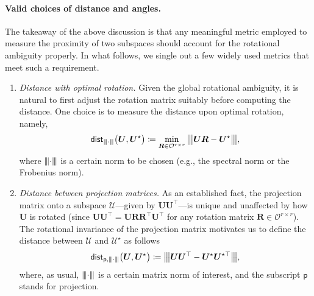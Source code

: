 \paragraph{Valid choices of distance and angles.}
The takeaway of the above discussion is that any meaningful metric employed to measure the proximity of two subspaces should account for the rotational ambiguity properly.
In what follows, we single out a few widely used metrics that meet such a requirement.




\begin{enumerate}

		
\item \emph{Distance with optimal rotation.}  Given the global rotational ambiguity, it is natural to first adjust the rotation matrix suitably before computing the distance.  One choice is to measure the distance upon optimal rotation, namely,
%
\begin{align}
	\mathsf{dist}_{{\left\vert\kern-0.25ex\left\vert\kern-0.25ex\left\vert \cdot \right\vert\kern-0.25ex\right\vert\kern-0.25ex\right\vert}}\big(\bm{U},{\bm{U}}^{\star}\big) \coloneqq
	\min _{\bm{R}\in \mathcal{O}^{r\times r}} {\big\vert\kern-0.25ex\big\vert\kern-0.25ex\big\vert  \bm{U} \bm{R} - \bm{U}^{\star}   \big\vert\kern-0.25ex\big\vert\kern-0.25ex\big\vert} ,
	\label{defn:dist-rotation}
\end{align}
where ${\left\vert\kern-0.25ex\left\vert\kern-0.25ex\left\vert \cdot \right\vert\kern-0.25ex\right\vert\kern-0.25ex\right\vert}$ is a certain norm to be chosen (e.g., the spectral norm or the Frobenius norm).



		
\item \emph{Distance between projection matrices.}  As an established fact, the projection matrix onto a subspace $\mathcal{U}$---given by $\bm{U}\bm{U}^{\top}$---is unique and unaffected by how $\bm{U}$ is rotated (since $\bm{U}\bm{U}^{\top}=\bm{U}\bm{R}\bm{R}^{\top}\bm{U}^{\top}$ for any rotation matrix $\bm{R}\in \mathcal{O}^{r\times r}$).
The rotational invariance of the projection matrix motivates us to define the distance between  $\mathcal{U}$
and ${\mathcal{U}}^{\star}$ as follows
%
\begin{equation}
	\mathsf{dist}_{\mathsf{p},{\left\vert\kern-0.25ex\left\vert\kern-0.25ex\left\vert \cdot \right\vert\kern-0.25ex\right\vert\kern-0.25ex\right\vert}}\big(\bm{U},{\bm{U}}^{\star}\big) \coloneqq {\big\vert\kern-0.25ex\big\vert\kern-0.25ex\big\vert \bm{U} \bm{U}^{\top}- {\bm{U}}^{\star} {\bm{U}}^{\star\top} \big\vert\kern-0.25ex\big\vert\kern-0.25ex\big\vert},
	\label{eq:algebraic-dist}
\end{equation}
%
where, as usual, ${\left\vert\kern-0.25ex\left\vert\kern-0.25ex\left\vert \cdot \right\vert\kern-0.25ex\right\vert\kern-0.25ex\right\vert}$ is a certain matrix norm of interest, and the subscript $\mathsf{p}$ stands for projection.



\end{enumerate}
